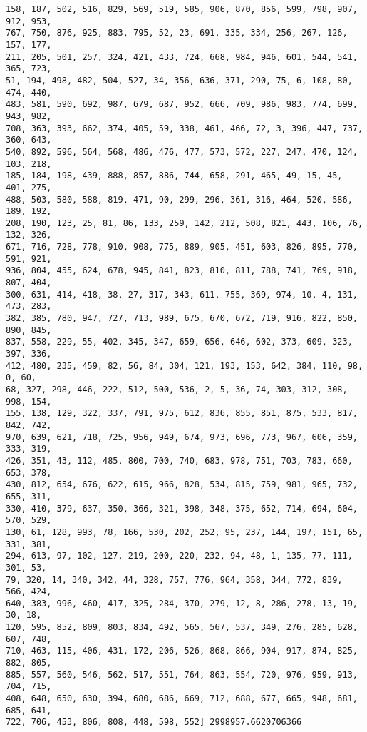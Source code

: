 \documentclass[11pt]{article}
\begin{document}
\begin{Verbatim}[commandchars=\\\{\}]
158, 187, 502, 516, 829, 569, 519, 585, 906, 870, 856, 599, 798, 907, 912, 953,
767, 750, 876, 925, 883, 795, 52, 23, 691, 335, 334, 256, 267, 126, 157, 177,
211, 205, 501, 257, 324, 421, 433, 724, 668, 984, 946, 601, 544, 541, 365, 723,
51, 194, 498, 482, 504, 527, 34, 356, 636, 371, 290, 75, 6, 108, 80, 474, 440,
483, 581, 590, 692, 987, 679, 687, 952, 666, 709, 986, 983, 774, 699, 943, 982,
708, 363, 393, 662, 374, 405, 59, 338, 461, 466, 72, 3, 396, 447, 737, 360, 643,
540, 892, 596, 564, 568, 486, 476, 477, 573, 572, 227, 247, 470, 124, 103, 218,
185, 184, 198, 439, 888, 857, 886, 744, 658, 291, 465, 49, 15, 45, 401, 275,
488, 503, 580, 588, 819, 471, 90, 299, 296, 361, 316, 464, 520, 586, 189, 192,
208, 190, 123, 25, 81, 86, 133, 259, 142, 212, 508, 821, 443, 106, 76, 132, 326,
671, 716, 728, 778, 910, 908, 775, 889, 905, 451, 603, 826, 895, 770, 591, 921,
936, 804, 455, 624, 678, 945, 841, 823, 810, 811, 788, 741, 769, 918, 807, 404,
300, 631, 414, 418, 38, 27, 317, 343, 611, 755, 369, 974, 10, 4, 131, 473, 283,
382, 385, 780, 947, 727, 713, 989, 675, 670, 672, 719, 916, 822, 850, 890, 845,
837, 558, 229, 55, 402, 345, 347, 659, 656, 646, 602, 373, 609, 323, 397, 336,
412, 480, 235, 459, 82, 56, 84, 304, 121, 193, 153, 642, 384, 110, 98, 0, 60,
68, 327, 298, 446, 222, 512, 500, 536, 2, 5, 36, 74, 303, 312, 308, 998, 154,
155, 138, 129, 322, 337, 791, 975, 612, 836, 855, 851, 875, 533, 817, 842, 742,
970, 639, 621, 718, 725, 956, 949, 674, 973, 696, 773, 967, 606, 359, 333, 319,
426, 351, 43, 112, 485, 800, 700, 740, 683, 978, 751, 703, 783, 660, 653, 378,
430, 812, 654, 676, 622, 615, 966, 828, 534, 815, 759, 981, 965, 732, 655, 311,
330, 410, 379, 637, 350, 366, 321, 398, 348, 375, 652, 714, 694, 604, 570, 529,
130, 61, 128, 993, 78, 166, 530, 202, 252, 95, 237, 144, 197, 151, 65, 331, 381,
294, 613, 97, 102, 127, 219, 200, 220, 232, 94, 48, 1, 135, 77, 111, 301, 53,
79, 320, 14, 340, 342, 44, 328, 757, 776, 964, 358, 344, 772, 839, 566, 424,
640, 383, 996, 460, 417, 325, 284, 370, 279, 12, 8, 286, 278, 13, 19, 30, 18,
120, 595, 852, 809, 803, 834, 492, 565, 567, 537, 349, 276, 285, 628, 607, 748,
710, 463, 115, 406, 431, 172, 206, 526, 868, 866, 904, 917, 874, 825, 882, 805,
885, 557, 560, 546, 562, 517, 551, 764, 863, 554, 720, 976, 959, 913, 704, 715,
408, 648, 650, 630, 394, 680, 686, 669, 712, 688, 677, 665, 948, 681, 685, 641,
722, 706, 453, 806, 808, 448, 598, 552] 2998957.6620706366
    \end{Verbatim}

    \begin{center}
    \end{center}
    { \hspace*{\fill} \\}
    

    
    
    
\end{document}
